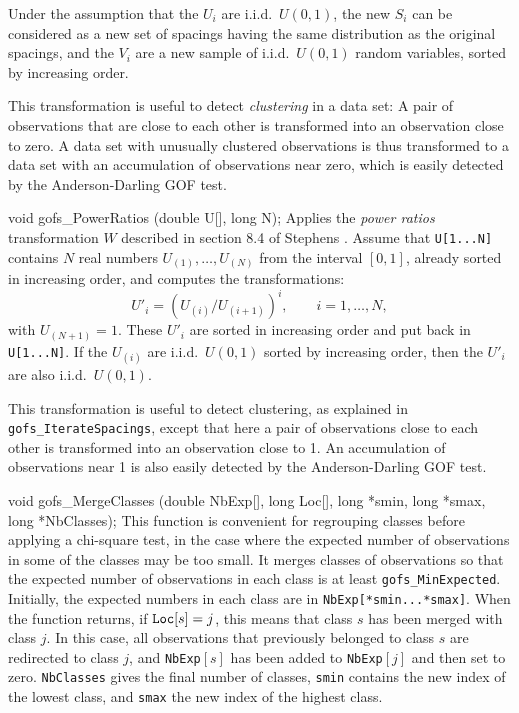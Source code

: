   Under the assumption that the $U_i$ are i.i.d.\ $U(0,1)$, the new
  $S_i$ can be considered as a new set of spacings having the same
  distribution as the original spacings, and the $V_i$ are a new sample
  of i.i.d.\ $U(0,1)$ random variables, sorted by increasing order.

  This transformation is useful to detect {\em clustering\/} in a data
  set: A pair of observations that are close to each other is transformed
  into an observation close to zero.  A data set with unusually clustered
  observations is thus transformed to a data set with an
  accumulation of observations near zero, which is easily detected by
  the Anderson-Darling GOF test.
 \endtab
\code


void gofs_PowerRatios (double U[], long N);
\endcode
 \tab  Applies the {\em power ratios\/} transformation $W$ described
   in section 8.4 of Stephens \cite{tSTE86a}.
   Assume that {\tt U[1...N]} contains $N$ real numbers
   $U_{(1)},\dots,U_{(N)}$ from the interval $[0,1]$,
   already sorted in increasing order, and computes the transformations:
     $$ U'_i = (U_{(i)} / U_{(i+1)})^i, \qquad  i=1,\dots,N,$$
   with $U_{(N+1)} = 1$.
   These $U'_i$ are sorted in increasing order and put back in
   {\tt U[1...N]}.
   If the $U_{(i)}$ are i.i.d.\ $U(0,1)$ sorted by increasing order,
   then the $U'_i$ are also i.i.d.\ $U(0,1)$.

  This transformation is useful to detect clustering, as explained in
  {\tt gofs\_IterateSpacings}, except that here a pair of
  observations close to each other is transformed
  into an observation close to 1.
  An accumulation of observations near 1 is also easily detected by
  the Anderson-Darling GOF test.
 \endtab
\code


void gofs_MergeClasses (double NbExp[], long Loc[],
                        long *smin, long *smax, long *NbClasses);
\endcode
 \tab This function is convenient for regrouping classes before
   applying a chi-square test,
   in the case where the expected number of observations in some of
   the classes may be too small.
   It merges classes of observations so that the expected
   number of observations in each class is at least
   {\tt gofs\_MinExpected}. Initially, the expected numbers in each class
   are in {\tt NbExp[*smin...*smax]}.
   When the function returns, if ${\tt Loc}[s] = j$, this means that class
   $s$ has been merged with class $j$.
   In this case, all observations that previously belonged to class $s$
   are redirected to class $j$,
   and {\tt NbExp$[s]$} has been added to {\tt NbExp$[j]$}
   and then set to zero.
   {\tt NbClasses} gives the final number of classes,
   {\tt smin} contains the new index of the lowest class,
   and {\tt smax} the new index of the highest class.
 \endtab
\code


